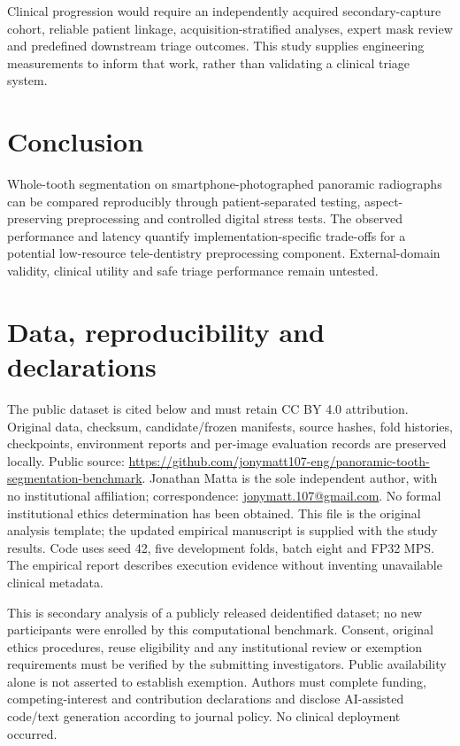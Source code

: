 \documentclass[11pt]{article}
\begin{document}
Clinical progression would require an independently acquired secondary-capture cohort, reliable patient linkage, acquisition-stratified analyses, expert mask review and predefined downstream triage outcomes. This study supplies engineering measurements to inform that work, rather than validating a clinical triage system.

\section{Conclusion}
Whole-tooth segmentation on smartphone-photographed panoramic radiographs can be compared reproducibly through patient-separated testing, aspect-preserving preprocessing and controlled digital stress tests. The observed performance and latency quantify implementation-specific trade-offs for a potential low-resource tele-dentistry preprocessing component. External-domain validity, clinical utility and safe triage performance remain untested.

\section*{Data, reproducibility and declarations}
The public dataset is cited below and must retain CC BY 4.0 attribution. Original data, checksum, candidate/frozen manifests, source hashes, fold histories, checkpoints, environment reports and per-image evaluation records are preserved locally. Public source: \url{https://github.com/jonymatt107-eng/panoramic-tooth-segmentation-benchmark}. Jonathan Matta is the sole independent author, with no institutional affiliation; correspondence: \href{mailto:jonymatt.107@gmail.com}{jonymatt.107@gmail.com}. No formal institutional ethics determination has been obtained. This file is the original analysis template; the updated empirical manuscript is supplied with the study results. Code uses seed 42, five development folds, batch eight and FP32 MPS. The empirical report describes execution evidence without inventing unavailable clinical metadata.

This is secondary analysis of a publicly released deidentified dataset; no new participants were enrolled by this computational benchmark. Consent, original ethics procedures, reuse eligibility and any institutional review or exemption requirements must be verified by the submitting investigators. Public availability alone is not asserted to establish exemption. Authors must complete funding, competing-interest and contribution declarations and disclose AI-assisted code/text generation according to journal policy. No clinical deployment occurred.
\end{document}
